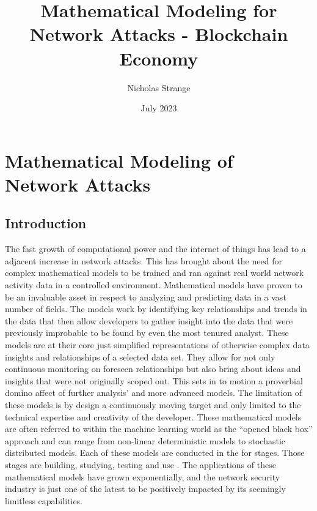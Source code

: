 \documentclass{article}
\title{Mathematical Modeling for Network Attacks - Blockchain Economy}
\author[1, 2, 4, $\dag$]{Nicholas Strange}
\affil[1]{Blockchain and Smart contract Systems Course Research Report}
\affil[2]{MS in  Financial Technology}
\affil[3]{Computer Science Faculty}
\affil[4]{University of Central Florida, USA}
\affil[*]{Email correspondence to: ramya.akula@ucf.edu}
\date{July 2023}
\begin{document}
\maketitle

\section{Mathematical Modeling of Network Attacks} 
\subsection{Introduction}
The fast growth of computational power and the internet of things has lead to a adjacent increase in network attacks. This has brought about the need for complex mathematical models to be trained and ran against real world network activity data in a controlled environment. Mathematical models have proven to be an invaluable asset in respect to analyzing and predicting data in a vast number of fields. The models work by identifying key relationships and trends in the data that then allow developers to gather insight into the data that were previously improbable to be found by even the most tenured analyst. These models are at their core just simplified representations of otherwise complex data insights and relationships of a selected data set. They allow for not only continuous monitoring on foreseen relationships but also bring about ideas and insights that were not originally scoped out. This sets in to motion a proverbial domino affect of further analysis' and more advanced models. The limitation of these models is by design a continuously moving target and only limited to the technical expertise and creativity of the developer. These mathematical models are often referred to within the machine learning world as the “opened black box” approach and can range from non-linear deterministic models to stochastic distributed models\cite{myung2002mathematical}. Each of these models are conducted in the for stages. Those stages are building, studying, testing and use \cite{Marion2008}. The applications of these mathematical models have grown exponentially, and the network security industry is just one of the latest to be positively impacted by its seemingly limitless capabilities. 
\end{document}
